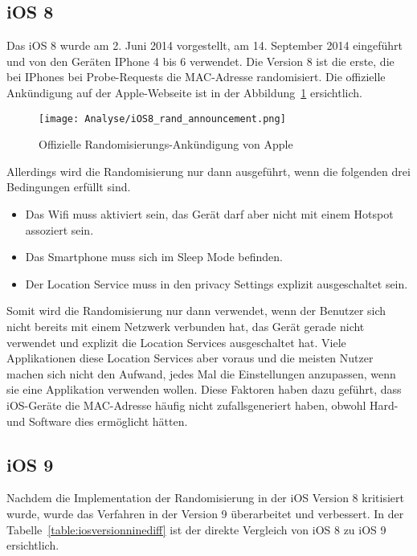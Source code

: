 \subsection{iOS 8}
Das iOS 8 wurde am 2. Juni 2014 vorgestellt, am 14. September 2014
eingeführt und von den Geräten IPhone 4 bis 6 verwendet. 
Die Version 8 ist die erste, die bei IPhones bei Probe-Requests die 
MAC-Adresse randomisiert.
Die offizielle Ankündigung auf der Apple-Webseite ist in der 
Abbildung~\ref{figure:MACRandAnnoucement} ersichtlich.

\begin{figure}[h!]
    \centering
    \texttt{[image: Analyse/iOS8\_rand\_announcement.png]}
    \caption{Offizielle Randomisierungs-Ankündigung von Apple}
    \label{figure:MACRandAnnoucement}
\end{figure}

Allerdings wird die Randomisierung nur dann ausgeführt, wenn die folgenden
drei Bedingungen erfüllt sind.

\begin{itemize}
    \item Das Wifi muss aktiviert sein, das Gerät darf aber nicht mit einem Hotspot assoziert sein.
    \item Das Smartphone muss sich im Sleep Mode befinden.
    \item Der Location Service muss in den privacy Settings explizit ausgeschaltet sein.
\end{itemize}

\clearpage

Somit wird die Randomisierung nur dann verwendet, wenn der Benutzer sich nicht
bereits mit einem Netzwerk verbunden hat, das Gerät gerade nicht verwendet und
explizit die Location Services ausgeschaltet hat.
Viele Applikationen diese Location Services aber voraus und 
die meisten Nutzer machen sich nicht den Aufwand, jedes Mal die Einstellungen
anzupassen, wenn sie eine Applikation verwenden wollen. 
Diese Faktoren haben dazu geführt, dass iOS-Geräte die MAC-Adresse häufig nicht 
zufallsgeneriert haben, obwohl Hard- und Software dies ermöglicht hätten.

\subsection{iOS 9}
Nachdem die Implementation der Randomisierung in der iOS Version 8 kritisiert
wurde, wurde das Verfahren in der Version 9 überarbeitet und verbessert.
In der Tabelle~\ref{table:iosversionninediff} ist der direkte Vergleich 
von iOS 8 zu iOS 9 ersichtlich.


